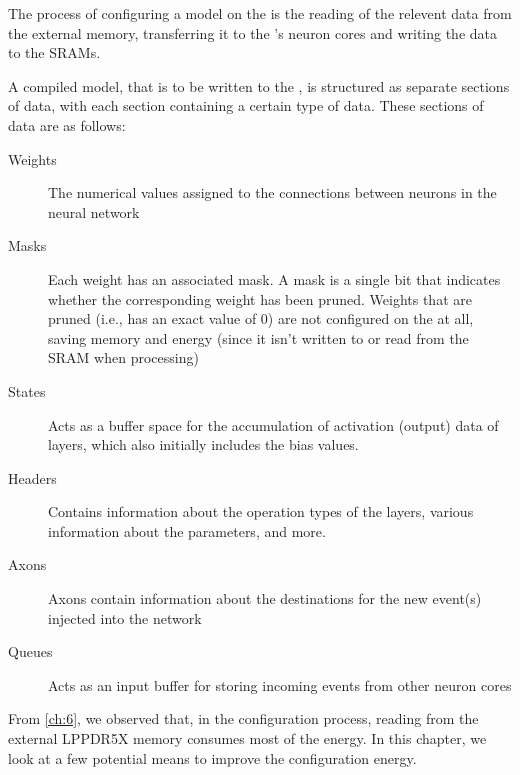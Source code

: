 The process of configuring a model on the \graicore{} is the reading of the relevent data from the external memory, transferring it to the \graicore{}'s neuron cores and writing the data to the SRAMs.

A compiled model, that is to be written to the \graicore{}, is structured as separate sections of data, with each section containing a certain type of data.
These sections of data are as follows:
\begin{description}
    \item[Weights] 
    The numerical values assigned to the connections between neurons in the neural network
    \item[Masks] 
    Each weight has an associated mask.
    A mask is a single bit that indicates whether the corresponding weight has been pruned.
    Weights that are pruned (i.e., has an exact value of $0$) are not configured on the \graicore{} at all, saving memory and energy (since it isn't written to or read from the SRAM when processing)
    \item[States] 
    Acts as a buffer space for the accumulation of activation (output) data of layers, which also initially includes the bias values.
    \item[Headers] 
    Contains information about the operation types of the layers, various information about the parameters, and more.
    \item[Axons] 
    Axons contain information about the destinations for the new event(s) injected into the network
    \item[Queues] 
    Acts as an input buffer for storing incoming events from other neuron cores 
\end{description}

From \cref{ch:6}, we observed that, in the configuration process, reading from the external LPPDR5X memory consumes most of the energy.
In this chapter, we look at a few potential means to improve the configuration energy.
